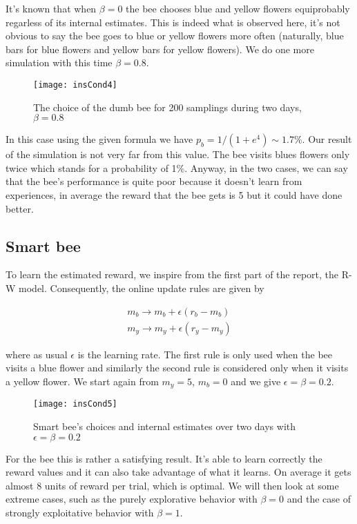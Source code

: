 It's known that when $\beta = 0$ the bee chooses blue and yellow
flowers equiprobably regarless of its internal estimates. This is indeed what
is observed here, it's not obvious to say the bee goes to blue or yellow
flowers more often (naturally, blue bars for blue flowers and yellow bars for
yellow flowers). We do one more simulation with this time $\beta = 0.8$.

\begin{figure}[H]
  \centering
  \texttt{[image: insCond4]}
  \caption {The choice of the dumb bee for 200 samplings during two days, 
            $\beta = 0.8$}
\end{figure}

In this case using the given formula we have $p_b = 1/(1 + e^4) \sim 1.7\% $.
Our result of the simulation is not very far from this value. The bee visits
blues flowers only twice which stands for a probability of 1\%. Anyway, in the
two cases, we can say that the bee's performance is quite poor because it
doesn't learn from experiences, in average the reward that the bee gets is 5
but it could have done better.

\subsection{Smart bee}

To learn the estimated reward, we inspire from the first part of the report,
the R-W model. Consequently, the online update rules are given by

\begin{gather*}
  m_b \rightarrow m_b + \epsilon(r_b - m_b)\\
  m_y \rightarrow m_y + \epsilon(r_y - m_y)
\end{gather*}

where as usual $\epsilon$ is the learning rate. The first rule is only used
when the bee visits a blue flower and similarly the second rule is considered
only when it visits a yellow flower. We start again from $m_y = 5$, $m_b = 0$
and we give $\epsilon = \beta = 0.2$.

\begin{figure}[H]
  \centering
  \texttt{[image: insCond5]}
  \caption {Smart bee's choices and internal estimates over two days with 
            $\epsilon = \beta = 0.2$}
\end{figure}

For the bee this is rather a satisfying result. It's able to learn correctly
the reward values and it can also take advantage of what it learns. On average
it gets almost 8 units of reward per trial, which is optimal. We will
then look at some extreme cases, such as the purely explorative behavior with
$\beta = 0$ and the case of strongly exploitative behavior with $\beta=1$.

